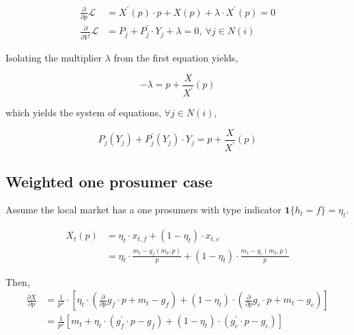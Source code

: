 \documentclass[american]{scrartcl}
\begin{document}
\begin{equation}
    \begin{split}
        \frac{\partial}{\partial p} \mathcal{L} &= X^\prime(p) \cdot p + X(p) + \lambda \cdot X^\prime(p) = 0 \\
        \frac{\partial}{\partial Y^j} \mathcal{L} &= P_j + P^\prime_j \cdot Y_j + \lambda =0, \ \forall j \in N(i)
    \end{split}
\end{equation}

Isolating the multiplier $\lambda$ from the first equation yields,

\begin{equation}
    - \lambda = p + \frac{X}{X^\prime}(p)
\end{equation}

which yields the system of equations, $\forall j \in N(i)$,

\begin{equation}
    P_j(Y_j) + P^\prime_j(Y_j) \cdot Y_j = p + \frac{X}{X^\prime}(p)
\end{equation}

\subsection{Weighted one prosumer case}

Assume the local market has a one prosumers with type indicator $\mathbf{1}\{h_t = f\} = \eta_t$.

\begin{equation}
    \begin{split}
        X_t(p) &= \eta_t \cdot x_{t, f} + (1 - \eta_t) \cdot x_{t, c} \\
        &= \eta_t \cdot \frac{m_t - g_f(m_t, p)}{p} + (1 - \eta_t) \cdot \frac{m_t - g_c(m_t, p)}{p}
    \end{split}
\end{equation}


Then,
\begin{equation}
    \begin{split}
        \frac{\partial X}{\partial p} &= \frac{1}{p^2} \cdot \left[ \eta_t \cdot \left(\frac{\partial}{\partial p} g_f \cdot p + m_t - g_f \right) + (1 - \eta_t) \cdot \left(\frac{\partial}{\partial p} g_c \cdot p + m_t - g_c \right) \right] \\
        &=\frac{1}{p^2} \left[m_t + \eta_t \cdot \left( g^\prime_f \cdot p - g_f \right) + (1 - \eta_t) \cdot \left( g^\prime_c \cdot p - g_c \right) \right]
    \end{split}
\end{equation}
\end{document}
